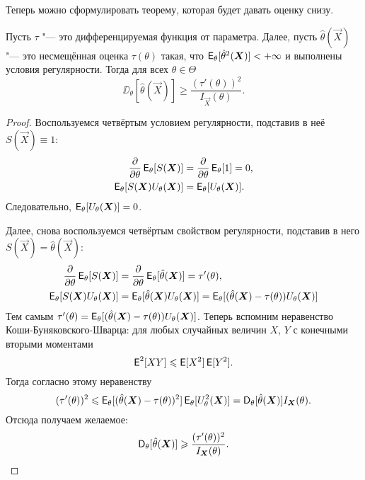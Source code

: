 Теперь можно сформулировать теорему, которая будет давать оценку снизу.
\begin{theorem}
	Пусть $\tau$ "--- это дифференцируемая функция от параметра. Далее, пусть $\hat{\theta}(\vec{X})$ "--- это несмещённая оценка $\tau(\theta)$ такая, что $\operatorname{\mathsf{E}}_{\theta}[\hat{\theta}^{2}(\bm{X})] < +\infty$ и выполнены условия регулярности. Тогда для всех $\theta \in \Theta$
	\[
		\DD_{\theta}[\hat{\theta}(\vec{X})] \geq \frac{(\tau'(\theta))^{2}}{I_{\vec{X}}(\theta)}.
	\]
\end{theorem}
\begin{proof}
	Воспользуемся четвёртым условием регулярности, подставив в неё $S(\vec{X}) \equiv 1$:
	\begin{align*}
		\pdv{\theta}\operatorname{\mathsf{E}}_{\theta}[S(\bm{X})]
		&= \pdv{\theta}\operatorname{\mathsf{E}}_{\theta}[1] = 0, \\
		\operatorname{\mathsf{E}}_{\theta}[S(\bm{X})U_{\theta}(\bm{X})]
		&= \operatorname{\mathsf{E}}_{\theta}[U_{\theta}(\bm{X})].
	\end{align*}
	Следовательно, $\operatorname{\mathsf{E}}_{\theta}[U_{\theta}(\bm{X})] = 0$.
	
	Далее, снова воспользуемся четвёртым свойством регулярности, подставив в него $S(\vec{X}) = \hat{\theta}(\vec{X})$:
	\begin{align*}
		\pdv{\theta}\operatorname{\mathsf{E}}_{\theta}[S(\bm{X})]
		&= \pdv{\theta}\operatorname{\mathsf{E}}_{\theta}[\hat{\theta}(\bm{X})] = \tau'(\theta), \\
		\operatorname{\mathsf{E}}_{\theta}[S(\bm{X})U_{\theta}(\bm{X})] 
		&= \operatorname{\mathsf{E}}_{\theta}[\hat{\theta}(\bm{X})U_{\theta}(\bm{X})]
		= \operatorname{\mathsf{E}}_{\theta}[(\hat{\theta}(\bm{X}) - \tau(\theta))U_{\theta}(\bm{X})]
	\end{align*}
	Тем самым $\tau'(\theta) = \operatorname{\mathsf{E}}_{\theta}[(\hat{\theta}(\bm{X}) - \tau(\theta))U_{\theta}(\bm{X})]$. Теперь вспомним неравенство Коши-Буняковского-Шварца: для любых случайных величин $X$, $Y$ с конечными вторыми моментами
	\[
		\operatorname{\mathsf{E}}^{2}[XY] \leqslant \operatorname{\mathsf{E}}[X^{2}]\operatorname{\mathsf{E}}[Y^{2}].
	\]
	Тогда согласно этому неравенству
	\[
		(\tau'(\theta))^{2} \leqslant \operatorname{\mathsf{E}}_{\theta}[(\hat{\theta}(\bm{X}) - \tau(\theta))^{2}]\operatorname{\mathsf{E}}_{\theta}[U_{\theta}^{2}(\bm{X})] = \operatorname{\mathsf{D}}_{\theta}[\hat{\theta}(\bm{X})]I_{\bm{X}}(\theta).
	\]
	Отсюда получаем желаемое:
	\[
		\operatorname{\mathsf{D}}_{\theta}[\hat{\theta}(\bm{X})] \geqslant \frac{(\tau'(\theta))^{2}}{I_{\bm{X}}(\theta)}. \qedhere
	\]
\end{proof}

